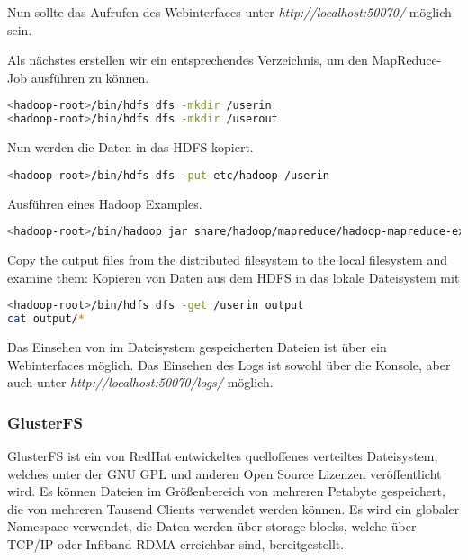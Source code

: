 Nun sollte das Aufrufen des Webinterfaces unter \textit{http://localhost:50070/} möglich sein.

Als nächstes erstellen wir ein entsprechendes Verzeichnis, um den MapReduce-Job ausführen zu können.
\begin{lstlisting}[language=bash, caption=Erstellen eines Verzeichnisses in dem die Daten gespeichert werden sollen]
<hadoop-root>/bin/hdfs dfs -mkdir /userin
<hadoop-root>/bin/hdfs dfs -mkdir /userout
\end{lstlisting}

Nun werden die Daten in das HDFS kopiert.
\begin{lstlisting}[language=bash, caption=Kopieren von Files ins HDFS]
<hadoop-root>/bin/hdfs dfs -put etc/hadoop /userin
\end{lstlisting}

Ausführen eines Hadoop Examples.
\begin{lstlisting}[language=bash, caption=Ausführen eines Hadoop Examples]
<hadoop-root>/bin/hadoop jar share/hadoop/mapreduce/hadoop-mapreduce-examples-2.7.2.jar grep /userin /userout 'dfs[a-z.]+'
\end{lstlisting}

Copy the output files from the distributed filesystem to the local filesystem and examine them:
Kopieren von Daten aus dem HDFS in das lokale Dateisystem mit 
\begin{lstlisting}[language=bash, caption=Kopieren von Files aus dem HDFS]
<hadoop-root>/bin/hdfs dfs -get /userin output
cat output/*
\end{lstlisting}

Das Einsehen von im Dateisystem gespeicherten Dateien ist über ein Webinterfaces möglich.
Das Einsehen des Logs ist sowohl über die Konsole, aber auch unter \textit{http://localhost:50070/logs/} möglich.

\subsubsection{GlusterFS}
\label{subsubsec:GlusterFS}
GlusterFS ist ein von RedHat entwickeltes quelloffenes verteiltes Dateisystem, welches unter der GNU GPL und anderen Open Source Lizenzen veröffentlicht wird. Es können Dateien im Größenbereich von mehreren Petabyte gespeichert, die von mehreren Tausend Clients verwendet werden können. Es wird ein globaler Namespace verwendet, die Daten werden über storage blocks, welche über TCP/IP oder Infiband RDMA erreichbar sind, bereitgestellt.

